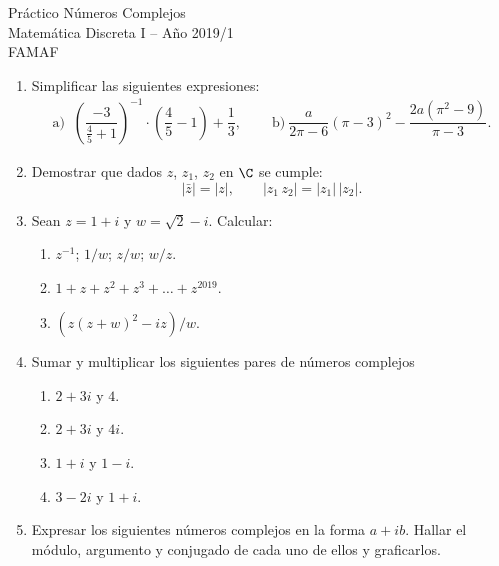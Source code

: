 \documentclass[12pt,spanish,makeidx]{amsbook}
\begin{document}
	
	{\bf \begin{center} Práctico Números Complejos \\ Matemática Discreta I -- Año 2019/1 \\ FAMAF \end{center}}
	
	\smallskip


\begin{enumerate}

\item
Simplificar las siguientes expresiones:
$$\begin{array}{ll}
 \text{a) } \ \left(\dfrac{-3}{\frac{4}{5}+1}\right)^{-1}\cdot\left(\dfrac{4}{5}-1\right) + \dfrac{1}{3}, \quad &
\text{ b)} \ \dfrac{a}{2\pi-6}(\pi-3)^2 -\dfrac{2a(\pi^2-9)}{\pi-3}.
\end{array}$$

\vspace{.5cm}


\item Demostrar que  dados $z$, $z_1$, $z_2$ en $\C$ se cumple:
\[ |\bar z|= |z|, \qquad |z_1 \, z_2|= |z_1| \, |z_2|. \]

\vspace{.5cm}


\item Sean $z=1+i$ y $w=\sqrt{2}-i$. Calcular:
 \begin{enumerate}
  \item $z^{-1}$; $1/w$; $z/w$; $w/z$.

  \item $1+z+z^2+z^3+\dots+z^{2019}$.

  \item $(z(z+w)^2-iz)/w$.
 \end{enumerate}


\vspace{.5cm}


\item Sumar y multiplicar los siguientes pares de números complejos
	\begin{enumerate}
		\item $2+ 3i$ y $4$.
		\item $2+ 3i$ y $4i$.
		\item $1 + i$ y $ 1 -i$.
		\item $3-2i$ y $1 +i$. 
	\end{enumerate}

\vspace{.5cm}


 \item Expresar los siguientes n{\'u}meros complejos en la forma $a +i b$.
 Hallar el m{\'o}dulo, argumento y conjugado de cada uno de ellos y graficarlos.


\end{enumerate}
\end{document}
